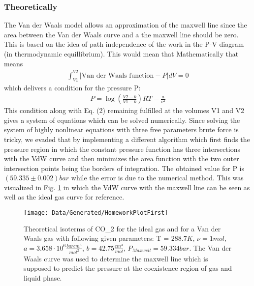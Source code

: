 \documentclass[a4paper,10pt,twocolumn]{article}
\begin{document}
    \subsubsection{Theoretically}\label{subsubsec:maxwellFromTheory}
    The Van der Waals model allows an approximation of the maxwell line since the area between the Van der Waals curve and a the maxwell line should be zero.
    This is based on the idea of path independence of the work in the P-V diagram (in thermodynamic equillibrium).
    This would mean that
    Mathematically that means
    \begin{align}
        \int_{V1}^{V2} |\text{Van der Waals function} - P| dV = 0
        \end{align}
    which delivers a condition for the pressure P:
    \begin{align}
        P=\log(\frac{V2-b}{V1-b}) RT - \frac{a}{v^2}
    \end{align}
    This condition along with Eq. (2) remaining fulfilled at the volumes V1 and V2 gives a system of equations which can be solved numerically.
    Since solving the system of highly nonlinear equations with three free parameters brute force is tricky, we evaded that by implementing a different algorithm
    which first finds the pressure region in which the constant pressure function has three intersections with the VdW curve and then minimizes the area function
    with the two outer intersection points being the borders of integration.
    The obtained value for P is $(59.335\pm 0.002) bar$ while the error is due to the numerical method.
    This was visualized in Fig. \ref{fig:homeworkPlotOne} in which the VdW curve with the maxwell line can be seen as well as the ideal gas curve for reference.
    \begin{figure}
        \begin{center}
            \texttt{[image: Data/Generated/HomeworkPlotFirst]}
            \caption[]{Theoretical isoterms of CO_2\) for the ideal gas and for a Van der Waals gas with following given parameters:
            T = $288.7K$, $\nu=1 mol$, $a=3.658\cdot 10^6 \frac{bar cm^6}{mol^2}$, $b=42.75 \frac{cm^3}{mol}$, $P_{Maxwell}=59.334 bar$. The Van der Waals curve was used to
            determine the maxwell line which is supposed to predict the pressure at the coexistence region of gas and liquid phase.}
            \label{fig:homeworkPlotOne}
        \end{center}
    \end{figure}
    
\end{document}
